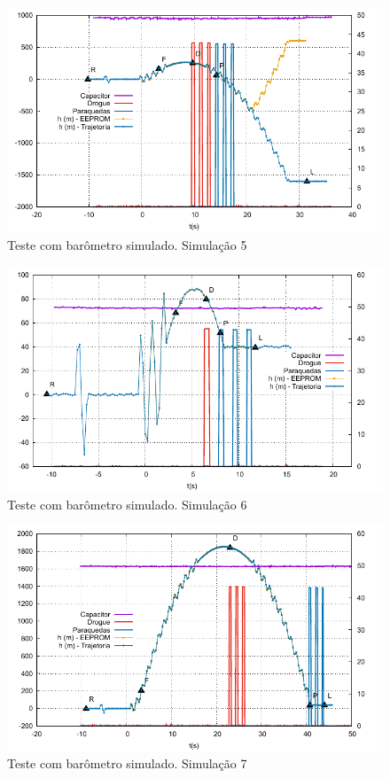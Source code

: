 \documentclass[12pt,a4paper]{article}
\begin{document}
\begin{figure}[!ht]
	\centering
	\includegraphics[width=\textwidth]{./data/simulations-v1.5.5/sim05/fig}
	\caption{Teste com barômetro simulado.  Simulação 5}
	\label{fig:sim05}
\end{figure}
\begin{figure}[!ht]
	\centering
	\includegraphics[width=\textwidth]{./data/simulations-v1.5.5/sim06/fig}
	\caption{Teste com barômetro simulado.  Simulação 6}
	\label{fig:sim06}
\end{figure}
\begin{figure}[!ht]
	\centering
	\includegraphics[width=\textwidth]{./data/simulations-v1.5.5/sim07/fig}
	\caption{Teste com barômetro simulado.  Simulação 7}
	\label{fig:sim07}
\end{figure}
\end{document}
